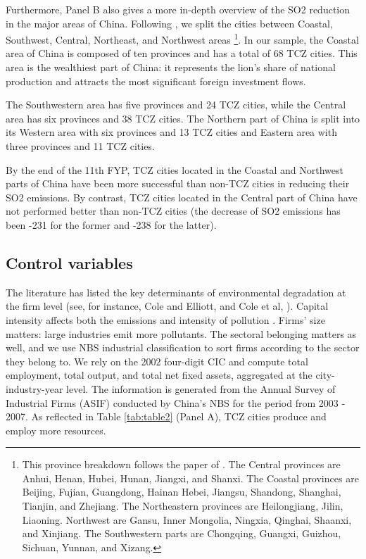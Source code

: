 \documentclass[12pt]{article}
\begin{document}
Furthermore, Panel B also gives a more in-depth overview of the SO2 reduction in the major areas of China. Following \cite{Wu2017-bl}, we split the cities between Coastal, Southwest, Central, Northeast, and Northwest areas \footnote{This province breakdown follows the paper of \cite{Wu2017-bl}. The Central provinces are Anhui, Henan, Hubei, Hunan, Jiangxi, and Shanxi. The Coastal provinces are Beijing, Fujian, Guangdong, Hainan Hebei, Jiangsu, Shandong, Shanghai, Tianjin, and Zhejiang. The Northeastern provinces are Heilongjiang, Jilin, Liaoning. Northwest are Gansu, Inner Mongolia, Ningxia, Qinghai, Shaanxi, and Xinjiang. The Southwestern parts are Chongqing, Guangxi, Guizhou, Sichuan, Yunnan, and Xizang.}. In our sample, the Coastal area of China is composed of ten provinces and has a total of 68 TCZ cities. This area is the wealthiest part of China: it represents the lion's share of national production and attracts the most significant foreign investment flows.

The Southwestern area has five provinces and 24 TCZ cities, while the Central area has six provinces and 38 TCZ cities. The Northern part of China is split into its Western area with six provinces and 13 TCZ cities and Eastern area with three provinces and 11 TCZ cities. 

By the end of the 11th FYP, TCZ cities located in the Coastal and Northwest parts of China have been more successful than non-TCZ cities in reducing their SO2 emissions. By contrast, TCZ cities located in the Central part of China have not performed better than non-TCZ cities (the decrease of SO2 emissions has been -231 for the former and -238 for the latter).

\subsection{Control variables} \label{sec:control}

The literature has listed the key determinants of environmental degradation at the firm level (see, for instance, Cole and Elliott, \citeyear{Cole2003-ad} and Cole et al, \citeyear{Cole2008-pj}). Capital intensity affects both the emissions and intensity of pollution \citep{Hering2014-af, Andersen2017-wf}. Firms' size matters: large industries emit more pollutants. The sectoral belonging matters as well, and we use NBS industrial classification to sort firms according to the sector they belong to. We rely on the 2002 four-digit CIC and compute total employment, total output, and total net fixed assets, aggregated at the city-industry-year level. The information is generated from the Annual Survey of Industrial Firms (ASIF) conducted by China's NBS for the period from 2003 - 2007. As reflected in Table \ref{tab:table2} (Panel A), TCZ cities produce and employ more resources.
\end{document}
